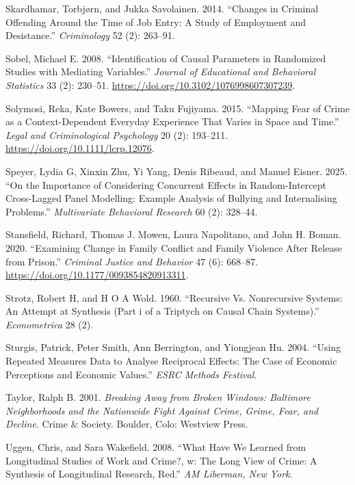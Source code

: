 \documentclass[
  letterpaper,
  DIV=11,
  numbers=noendperiod]{scrartcl}
\newlength{\cslhangindent}
\newenvironment{CSLReferences}[2] %
 {\begin{list}{}{%
  \setlength{\itemindent}{0pt}
  \setlength{\leftmargin}{0pt}
  \setlength{\parsep}{0pt}
  \ifodd #1
   \setlength{\leftmargin}{\cslhangindent}
   \setlength{\itemindent}{-1\cslhangindent}
  \fi
  \setlength{\itemsep}{#2\baselineskip}}}
 {\end{list}}
\begin{document}
\begin{CSLReferences}{1}{0}
Skardhamar, Torbjørn, and Jukka Savolainen. 2014. {``Changes in Criminal
Offending Around the Time of Job Entry: A Study of Employment and
Desistance.''} \emph{Criminology} 52 (2): 263--91.

Sobel, Michael E. 2008. {``Identification of Causal Parameters in
Randomized Studies with Mediating Variables.''} \emph{Journal of
Educational and Behavioral Statistics} 33 (2): 230--51.
\url{https://doi.org/10.3102/1076998607307239}.

Solymosi, Reka, Kate Bowers, and Taku Fujiyama. 2015. {``Mapping Fear of
Crime as a Context-Dependent Everyday Experience That Varies in Space
and Time.''} \emph{Legal and Criminological Psychology} 20 (2):
193--211. \url{https://doi.org/10.1111/lcrp.12076}.

Speyer, Lydia G, Xinxin Zhu, Yi Yang, Denis Ribeaud, and Manuel Eisner.
2025. {``On the Importance of Considering Concurrent Effects in
Random-Intercept Cross-Lagged Panel Modelling: Example Analysis of
Bullying and Internalising Problems.''} \emph{Multivariate Behavioral
Research} 60 (2): 328--44.

Stansfield, Richard, Thomas J. Mowen, Laura Napolitano, and John H.
Boman. 2020. {``Examining Change in Family Conflict and Family Violence
After Release from Prison.''} \emph{Criminal Justice and Behavior} 47
(6): 668--87. \url{https://doi.org/10.1177/0093854820913311}.

Strotz, Robert H, and H O A Wold. 1960. {``Recursive Vs. Nonrecursive
Systems: An Attempt at Synthesis (Part i of a Triptych on Causal Chain
Systems).''} \emph{Econometrica} 28 (2).

Sturgis, Patrick, Peter Smith, Ann Berrington, and Yiongjean Hu. 2004.
{``Using Repeated Measures Data to Analyse Reciprocal Effects: The Case
of Economic Perceptions and Economic Values.''} \emph{ESRC Methods
Festival}.

Taylor, Ralph B. 2001. \emph{Breaking Away from Broken Windows:
Baltimore Neighborhoods and the Nationwide Fight Against Crime, Grime,
Fear, and Decline}. Crime \& Society. Boulder, Colo: Westview Press.

Uggen, Chris, and Sara Wakefield. 2008. {``What Have We Learned from
Longitudinal Studies of Work and Crime?, w: The Long View of Crime: A
Synthesis of Longitudinal Research, Red.''} \emph{AM Liberman, New
York}.


\end{CSLReferences}
\end{document}
